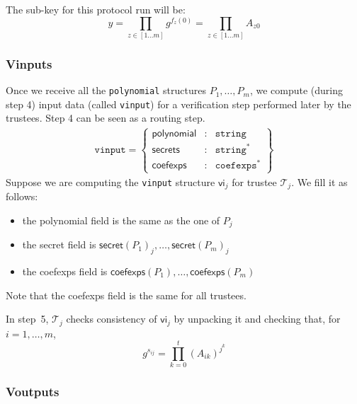 \documentclass[a4paper]{article}
\newcommand{\jstring}{\texttt{string}}
\begin{document}
The sub-key for this protocol run will be:
\[
y=\prod_{z\in[1\dots m]}g^{f_z(0)}=\prod_{z\in[1\dots m]}A_{z0}
\]

\subsubsection{Vinputs}
\label{vinputs}

Once we receive all the \texttt{polynomial} structures
$P_1,\dotsc,P_m$, we compute (during step 4) input data (called
\texttt{vinput}) for a verification step performed later by the
trustees. Step 4 can be seen as a routing step.
\begin{gather*}
  \texttt{vinput}=\left\{
    \begin{array}{rcl}
      \textsf{polynomial}&:&\jstring\\
      \textsf{secrets}&:&\jstring^\ast\\
      \textsf{coefexps}&:&\texttt{coefexps}^\ast
    \end{array}
  \right\}
\end{gather*}
Suppose we are computing the \texttt{vinput} structure $\textsf{vi}_j$
for trustee $\mathcal{T}_j$. We fill it as follows:
\begin{itemize}
\item the \textsf{polynomial} field is the same as the one of $P_j$
\item the \textsf{secret} field is
  $\textsf{secret}(P_1)_j,\dotsc,\textsf{secret}(P_m)_j$
\item the \textsf{coefexps} field is
  $\textsf{coefexps}(P_1),\dotsc,\textsf{coefexps}(P_m)$
\end{itemize}
Note that the \textsf{coefexps} field is the same for all trustees.

In step~5, $\mathcal{T}_j$ checks consistency of $\textsf{vi}_j$ by unpacking it
and checking that, for $i=1,\dotsc,m$,
\[
g^{s_{ij}}=\prod_{k=0}^t(A_{ik})^{j^k}
\]

\subsubsection{Voutputs}
\label{voutputs}
\end{document}

